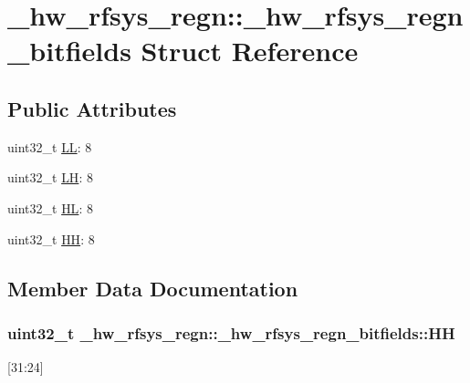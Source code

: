 \hypertarget{struct__hw__rfsys__regn_1_1__hw__rfsys__regn__bitfields}{}\section{\+\_\+hw\+\_\+rfsys\+\_\+regn\+:\+:\+\_\+hw\+\_\+rfsys\+\_\+regn\+\_\+bitfields Struct Reference}
\label{struct__hw__rfsys__regn_1_1__hw__rfsys__regn__bitfields}
\subsection*{Public Attributes}
\begin{DoxyCompactItemize}
\item 
uint32\+\_\+t \hyperlink{struct__hw__rfsys__regn_1_1__hw__rfsys__regn__bitfields_ac5f9d5372f5c7e1ed06471f870e48ce8}{LL}\+: 8
\item 
uint32\+\_\+t \hyperlink{struct__hw__rfsys__regn_1_1__hw__rfsys__regn__bitfields_a66e024bee6a0e8aafa367974c69092a9}{LH}\+: 8
\item 
uint32\+\_\+t \hyperlink{struct__hw__rfsys__regn_1_1__hw__rfsys__regn__bitfields_ad1ad8c3b3014ab1c20deaadd69283a6a}{HL}\+: 8
\item 
uint32\+\_\+t \hyperlink{struct__hw__rfsys__regn_1_1__hw__rfsys__regn__bitfields_a224e960d566e83ae13c10bd41c244a9f}{HH}\+: 8
\end{DoxyCompactItemize}


\subsection{Member Data Documentation}
\subsubsection[{\texorpdfstring{HH}{HH}}]{\setlength{\rightskip}{0pt plus 5cm}uint32\+\_\+t \+\_\+hw\+\_\+rfsys\+\_\+regn\+::\+\_\+hw\+\_\+rfsys\+\_\+regn\+\_\+bitfields\+::\+HH}\hypertarget{struct__hw__rfsys__regn_1_1__hw__rfsys__regn__bitfields_a224e960d566e83ae13c10bd41c244a9f}{}\label{struct__hw__rfsys__regn_1_1__hw__rfsys__regn__bitfields_a224e960d566e83ae13c10bd41c244a9f}
\mbox{[}31\+:24\mbox{]} 
